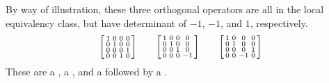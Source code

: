 By way of illustration, these three orthogonal operators are all in the  local equivalency class, but have determinant of $-1$, $-1$, and $1$, respectively.
\[
\begin{bsmallmatrix}
 1& 0 & 0 & 0 \\
  0 & 1 & 0 & 0 \\
  0 & 0 & 0 & 1 \\
  0 & 0 & 1 & 0 
\end{bsmallmatrix}
\qquad
\begin{bsmallmatrix}
 1& 0 & 0 & 0 \\
  0 & 1 & 0 & 0 \\
  0 & 0 & 1 & 0 \\
  0 & 0 & 0 & -1 
\end{bsmallmatrix}
\qquad
\begin{bsmallmatrix}
 1& 0 & 0 & 0 \\
  0 & 1 & 0 & 0 \\
  0 & 0 & 0 & 1 \\
  0 & 0 & -1 & 0 
\end{bsmallmatrix}
\notag
\]
These are a , a , and a  followed by a .






%





